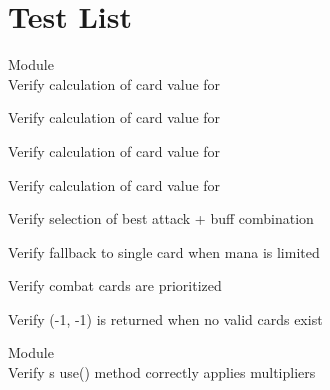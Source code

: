 \chapter{Test List}
\hypertarget{test}{}\label{test}

\begin{DoxyRefList}
\item[Module \doxylink{group___a_i___player}{AI\+\_\+\+Player} ]\hfill \\
\label{test__test000114}%
%
Verify calculation of card value for   



\label{test__test000115}%
%
Verify calculation of card value for   



\label{test__test000116}%
%
Verify calculation of card value for   



\label{test__test000117}%
%
Verify calculation of card value for   



\label{test__test000118}%
%
Verify selection of best attack + buff combination  



\label{test__test000119}%
%
Verify fallback to single card when mana is limited  



\label{test__test000120}%
%
Verify combat cards are prioritized  



\label{test__test000121}%
%
Verify (-\/1, -\/1) is returned when no valid cards exist  


\item[Module \doxylink{group___artifact_card}{Artifact\+Card} ]\hfill \\
\label{test__test000045}%
%
Verify \textquotesingle{}s use() method correctly applies multipliers  




\end{DoxyRefList}
